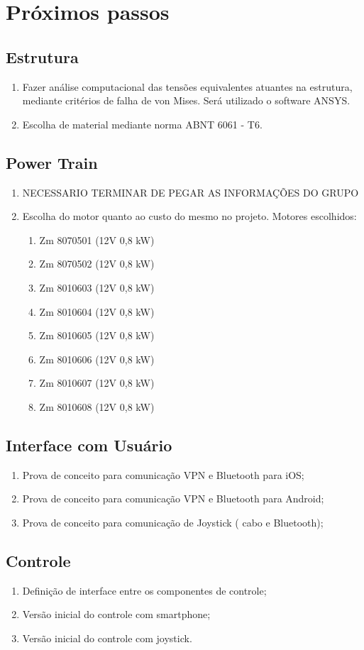 \section{Próximos passos}
  \subsection{Estrutura}
    \begin{enumerate}
      \item Fazer análise computacional das tensões equivalentes atuantes na estrutura, mediante critérios de falha de von Mises. Será utilizado o software ANSYS.
      \item Escolha de material mediante norma ABNT 6061 - T6.
    \end{enumerate}
  \subsection{Power Train}
    \begin{enumerate}
      \item NECESSARIO TERMINAR DE PEGAR AS INFORMAÇÕES DO GRUPO
      \item Escolha do motor quanto ao custo do mesmo no projeto. Motores escolhidos:
      \begin{enumerate}
        \item Zm 8070501 (12V 0,8 kW)
        \item Zm 8070502 (12V 0,8 kW)
        \item Zm 8010603 (12V 0,8 kW)
        \item Zm 8010604 (12V 0,8 kW)
        \item Zm 8010605 (12V 0,8 kW)
        \item Zm 8010606 (12V 0,8 kW)
        \item Zm 8010607 (12V 0,8 kW)
        \item Zm 8010608 (12V 0,8 kW)
      \end{enumerate}
    \end{enumerate}
  \subsection{Interface com Usuário}
    \begin{enumerate}
      \item Prova de conceito para comunicação VPN e Bluetooth para iOS;
      \item Prova de conceito para comunicação VPN e Bluetooth para Android;
      \item Prova de conceito para comunicação de Joystick ( cabo e Bluetooth);
    \end{enumerate}
  \subsection{Controle}
    \begin{enumerate}
     \item Definição de interface entre os componentes de controle;
     \item Versão inicial do controle com smartphone;
     \item Versão inicial do controle com joystick.
    \end{enumerate}
